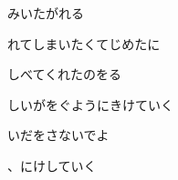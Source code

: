 \documentclass[a4paper,tate,twocolumn,12pt]{ltjtarticle}
\begin{document}
\begin{flushleft}
\begin{minipage}{\linewidth}
みいたがれる

れてしまいたくてじめたに

しべてくれたのをる

しいがをぐようにきけていく

いだをさないでよ

、にけしていく
\end{minipage}

\end{flushleft}
\end{document}
